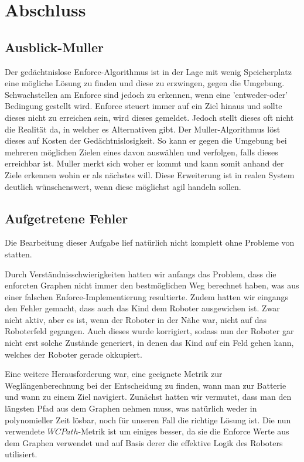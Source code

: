 \section{Abschluss}

\subsection{Ausblick-Muller}
Der gedächtnislose Enforce-Algorithmus ist in der Lage mit wenig Speicherplatz eine mögliche Lösung zu finden und diese zu erzwingen, gegen die Umgebung. Schwachstellen am Enforce sind jedoch zu erkennen, wenn eine 'entweder-oder' Bedingung gestellt wird. Enforce steuert immer auf ein Ziel hinaus und sollte dieses nicht zu erreichen sein, wird dieses gemeldet. Jedoch stellt dieses oft nicht die Realität da, in welcher es Alternativen gibt. Der Muller-Algorithmus löst dieses auf Kosten der Gedächtnislosigkeit. So kann er gegen die Umgebung bei mehreren möglichen Zielen eines davon auswählen und verfolgen, falls dieses erreichbar ist. Muller merkt sich woher er kommt und kann somit anhand der Ziele erkennen wohin er als nächstes will. Diese Erweiterung ist in realen System deutlich wünschenswert, wenn diese möglichst agil handeln sollen.
\subsection{Aufgetretene Fehler}
Die Bearbeitung dieser Aufgabe lief natürlich nicht komplett ohne Probleme von statten.\par

Durch Verständnisschwierigkeiten hatten wir anfangs das Problem, dass die enforcten Graphen nicht immer den bestmöglichen Weg berechnet haben, was aus einer falschen Enforce-Implementierung resultierte. Zudem hatten wir eingangs den Fehler gemacht, dass auch das Kind dem Roboter ausgewichen ist. Zwar nicht aktiv, aber es ist, wenn der Roboter in der Nähe war, nicht auf das Roboterfeld gegangen. Auch dieses wurde korrigiert, sodass nun der Roboter gar nicht erst solche Zustände generiert, in denen das Kind auf ein Feld gehen kann, welches der Roboter gerade okkupiert.\par

Eine weitere Herausforderung war, eine geeignete Metrik zur Weglängenberechnung bei der Entscheidung zu finden, wann man zur Batterie und wann zu einem Ziel navigiert. Zunächst hatten wir vermutet, dass man den längsten Pfad aus dem Graphen nehmen muss, was natürlich weder in polynomieller Zeit lösbar, noch für unseren Fall die richtige Lösung ist. Die nun verwendete $WCPath$-Metrik ist um einiges besser, da sie die Enforce Werte aus dem Graphen verwendet und auf Basis derer die effektive Logik des Roboters utilisiert.

